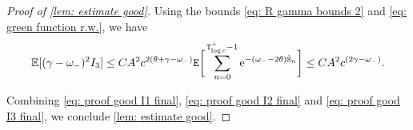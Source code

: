 \documentclass[10pt,a4paper]{amsart}
\begin{document}
\begin{proof}[Proof of \cref{lem: estimate good}]
\noindent Using the bounds \eqref{eq: R gamma bounds 2} and \eqref{eq: green function r.w.}, we have
\begin{equation}\label{eq: proof good I3 final}
\mathbb{E}[(\gamma-\omega_-)^2I_3]\leq CA^2c^{2(\theta+\gamma-\omega_-)}{\tt E}\bigg[\sum^{{\tt T}_{\log c}^+-1}_{n=0}\mathrm{e}^{-(\omega_--2\theta){\hat{\tt S}}_n}\bigg]\leq CA^2c^{(2\gamma-\omega_-)}.
\end{equation}

Combining \eqref{eq: proof good I1 final}, \eqref{eq: proof good I2 final} and \eqref{eq: proof good I3 final}, we conclude \cref{lem: estimate good}.
\end{proof}
\end{document}
